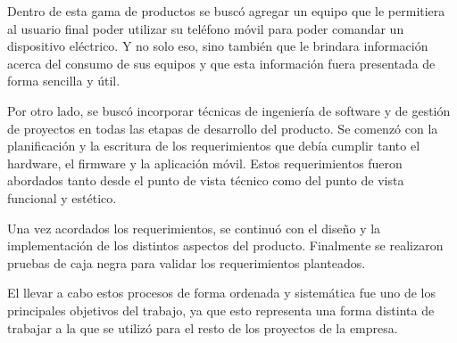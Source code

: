 Dentro de esta gama de productos se buscó agregar un equipo que le permitiera al usuario final poder utilizar su teléfono móvil para poder comandar un dispositivo eléctrico. Y no solo eso, sino también que le brindara información acerca del consumo de sus equipos y que esta información fuera presentada de forma sencilla y útil.

Por otro lado, se buscó incorporar técnicas de ingeniería de software y de gestión de proyectos en todas las etapas de desarrollo del producto. Se  comenzó con la planificación y la escritura de los requerimientos que debía cumplir tanto el hardware, el firmware y la aplicación móvil. Estos requerimientos fueron abordados tanto desde el punto de vista técnico como del punto de vista funcional y estético.

Una vez acordados los requerimientos, se continuó con el diseño y la implementación de los distintos aspectos del producto. Finalmente se realizaron pruebas de caja negra para validar los requerimientos planteados. 

El llevar a cabo estos procesos de forma ordenada y sistemática fue uno de los principales objetivos del trabajo, ya que esto representa una forma distinta de trabajar a la que se utilizó para el resto de los proyectos de la empresa.







